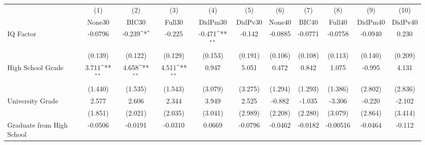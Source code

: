{
\def\sym#1{\ifmmode^{#1}\else\(^{#1}\)\fi}
\begin{tabular}{l*{10}{c}}
\toprule
            &\multicolumn{1}{c}{(1)}&\multicolumn{1}{c}{(2)}&\multicolumn{1}{c}{(3)}&\multicolumn{1}{c}{(4)}&\multicolumn{1}{c}{(5)}&\multicolumn{1}{c}{(6)}&\multicolumn{1}{c}{(7)}&\multicolumn{1}{c}{(8)}&\multicolumn{1}{c}{(9)}&\multicolumn{1}{c}{(10)}\\
            &\multicolumn{1}{c}{None30}&\multicolumn{1}{c}{BIC30}&\multicolumn{1}{c}{Full30}&\multicolumn{1}{c}{DidPm30}&\multicolumn{1}{c}{DidPv30}&\multicolumn{1}{c}{None40}&\multicolumn{1}{c}{BIC40}&\multicolumn{1}{c}{Full40}&\multicolumn{1}{c}{DidPm40}&\multicolumn{1}{c}{DidPv40}\\
\midrule
IQ Factor   &     -0.0796         &      -0.239\sym{*}  &      -0.225         &      -0.471\sym{**} &      -0.142         &     -0.0885         &     -0.0771         &     -0.0758         &     -0.0940         &       0.230         \\
            &     (0.139)         &     (0.122)         &     (0.129)         &     (0.153)         &     (0.191)         &     (0.106)         &     (0.108)         &     (0.113)         &     (0.140)         &     (0.209)         \\
\addlinespace
High School Grade&       3.711\sym{**} &       4.658\sym{**} &       4.511\sym{**} &       0.947         &       5.051         &       0.472         &       0.842         &       1.075         &      -0.995         &       4.131         \\
            &     (1.440)         &     (1.535)         &     (1.543)         &     (3.079)         &     (3.275)         &     (1.294)         &     (1.293)         &     (1.386)         &     (2.802)         &     (2.836)         \\
\addlinespace
University Grade&       2.577         &       2.606         &       2.344         &       3.949         &       2.525         &      -0.882         &      -1.035         &      -3.306         &      -0.220         &      -2.102         \\
            &     (1.851)         &     (2.021)         &     (2.035)         &     (3.041)         &     (2.989)         &     (2.208)         &     (2.280)         &     (3.079)         &     (2.864)         &     (3.414)         \\
\addlinespace
Graduate from High School&     -0.0506         &     -0.0191         &     -0.0310         &      0.0669         &     -0.0796         &     -0.0462         &     -0.0182         &    -0.00516         &     -0.0464         &      -0.112         \\

\end{tabular}}
